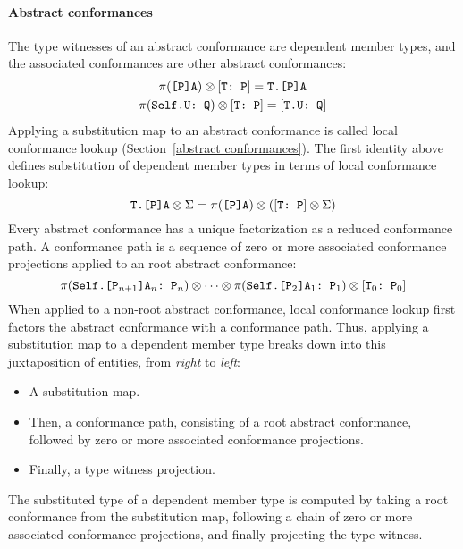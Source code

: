 \documentclass[../generics]{subfiles}
\begin{document}
\paragraph{Abstract conformances} The type witnesses of an abstract conformance are dependent member types, and the associated conformances are other abstract conformances:
\begin{gather*}
\pi(\texttt{[P]A}) \otimes [\texttt{T}\texttt{:~P}] = \texttt{T.[P]A}\\
\pi(\texttt{Self.U:~Q}) \otimes [\texttt{T}\texttt{:~P}] = [\texttt{T.U}\texttt{:~Q}]
\end{gather*}
Applying a substitution map to an abstract conformance is called local conformance lookup (Section~\ref{abstract conformances}). The first identity above defines substitution of dependent member types in terms of local conformance lookup:
\[\texttt{T.[P]A} \otimes \Sigma = \pi(\texttt{[P]A}) \otimes ([\texttt{T}\texttt{:~P}] \otimes \Sigma)\]
Every abstract conformance has a unique factorization as a reduced conformance path. A conformance path is a sequence of zero or more associated conformance projections applied to an root abstract conformance:
\[
\pi(\texttt{Self.[$\texttt{P}_{n+1}$]$\texttt{A}_n$:~$\texttt{P}_n$})
\otimes
\cdots
\otimes
\pi(\texttt{Self.[$\texttt{P}_2$]$\texttt{A}_1$:~$\texttt{P}_1$})
\otimes
[\texttt{T}_0\texttt{:~$\texttt{P}_0$}]
\]
When applied to a non-root abstract conformance, local conformance lookup first factors the abstract conformance with a conformance path. Thus, applying a substitution map to a dependent member type breaks down into this juxtaposition of entities, from \emph{right} to \emph{left}:
\begin{itemize}
\item A substitution map.
\item Then, a conformance path, consisting of a root abstract conformance, followed by zero or more associated conformance projections.
\item Finally, a type witness projection.
\end{itemize}
The substituted type of a dependent member type is computed by taking a root conformance from the substitution map, following a chain of zero or more associated conformance projections, and finally projecting the type witness.
\end{document}
